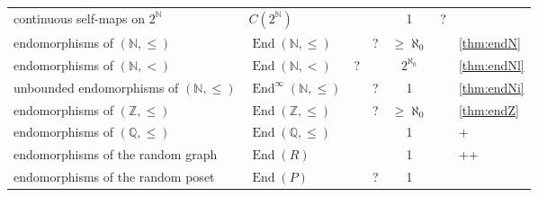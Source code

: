 \documentclass[11pt]{amsart}
\newcommand{\cmark}{\ding{51}}%
\newcommand{\xmark}{\ding{55}}%
\theoremstyle{definition}
\newcommand{\N}{\mathbb N}
\newcommand{\Z}{\mathbb Z}
\begin{document}
\begin{figure}
\begin{tabular}{ll|c|c|c|c|l}
    continuous self-maps on $2 ^ \N$      & $C(2 ^ \N)$  & \cmark                        & \cmark
                                          & 1                                          & ?                                       & \cite{main}                                     \\
    endomorphisms of \((\N,\leq)\)    & $\operatorname{End}(\N,\leq)$                      & \cmark    & ?
                                          &    $\geq\aleph_0$             & \cmark                            & \cref{thm:endN}                                    \\
endomorphisms of \((\N,<)\)    & $\operatorname{End}(\N,<)$                      &?    & \xmark
                                          & $2^{\aleph_0}$                                      & \cmark                        &\cref{thm:endNl}                                \\
unbounded endomorphisms of \((\N,\leq)\)    & $\operatorname{End}^{\infty}(\N,\leq)$                         & \cmark & ?
                                          & 1                                          & \cmark                             & \cref{thm:endNi}                                    \\
 endomorphisms of \((\Z,\leq)\)    & $\operatorname{End}(\Z,\leq)$                          & \cmark &?
                                          & $\geq \aleph_0$                   & \cmark                         &     \cref{thm:endZ}                                \\
    endomorphisms of \((\mathbb{Q},\leq)\)    & $\operatorname{End}(\mathbb{Q},\leq)$                       & \cmark   & \xmark
            & 1                                           & \cmark                        & \cite{PiSc}+\cite{main}                   \\
 endomorphisms of the random graph &$\operatorname{End}(R)$& \cmark   & \cmark
                                          & 1          & \cmark                     & \cite{EJMPP}+\cite{KR}+\cite{Hrushovski1992aa}                 \\
endomorphisms of the random poset&$\operatorname{End}(P)$& \cmark   & ?
                                          & 1          & \cmark                     & \cite{EJMPP}                  \\
\end{tabular}

\medskip


\end{figure}
\end{document}
